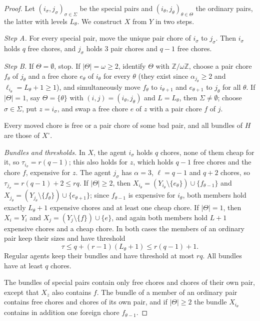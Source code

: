 \documentclass{amsart}
\numberwithin{equation}{section}
\theoremstyle{definition}
\theoremstyle{remark}
\begin{document}
\begin{proof}
Let $(i_\sigma,j_\sigma)_{\sigma\in\Sigma}$ be the special pairs and $(i_\theta,j_\theta)_{\theta\in\Theta}$ the ordinary pairs, the latter with levels $L_\theta$. We construct $X$ from $Y$ in two steps.

\emph{Step A.} For every special pair, move the unique pair chore of $i_\sigma$ to $j_\sigma$. Then $i_\sigma$ holds $q$ free chores, and $j_\sigma$ holds $3$ pair chores and $q-1$ free chores.

\emph{Step B.} If $\Theta=\emptyset$, stop. If $|\Theta|=\omega\ge2$, identify $\Theta$ with $\mathbb Z/\omega\mathbb Z$, choose a pair chore $f_\theta$ of $j_\theta$ and a free chore $e_\theta$ of $i_\theta$ for every $\theta$ (they exist since $\alpha_{j_\theta}\ge2$ and $\ell_{i_\theta}=L_\theta+1\ge1$), and simultaneously move $f_\theta$ to $i_{\theta+1}$ and $e_{\theta+1}$ to $j_\theta$ for all $\theta$. If $|\Theta|=1$, say $\Theta=\{\theta\}$ with $(i,j)=(i_\theta,j_\theta)$ and $L=L_\theta$, then $\Sigma\ne\emptyset$; choose $\sigma\in\Sigma$, put $z=i_\sigma$, and swap a free chore $e$ of $z$ with a pair chore $f$ of $j$.

Every moved chore is free or a pair chore of some bad pair, and all bundles of $H$ are those of $X^\circ$.

\emph{Bundles and thresholds.} In $X$, the agent $i_\sigma$ holds $q$ chores, none of them cheap for it, so $\tau_{i_\sigma}=r(q-1)$; this also holds for $z$, which holds $q-1$ free chores and the chore $f$, expensive for $z$. The agent $j_\sigma$ has $\alpha=3$, $\ell=q-1$ and $q+2$ chores, so $\tau_{j_\sigma}=r(q-1)+2\le rq$. If $|\Theta|\ge2$, then $X_{i_\theta}=(Y_{i_\theta}\setminus\{e_\theta\})\cup\{f_{\theta-1}\}$ and $X_{j_\theta}=(Y_{j_\theta}\setminus\{f_\theta\})\cup\{e_{\theta+1}\}$; since $f_{\theta-1}$ is expensive for $i_\theta$, both members hold exactly $L_\theta+1$ expensive chores and at least one cheap chore. If $|\Theta|=1$, then $X_i=Y_i$ and $X_j=(Y_j\setminus\{f\})\cup\{e\}$, and again both members hold $L+1$ expensive chores and a cheap chore. In both cases the members of an ordinary pair keep their sizes and have threshold
\begin{equation}\label{eq:Tt}
\tau\le q+(r-1)(L_\theta+1)\le r(q-1)+1 .
\end{equation}
Regular agents keep their bundles and have threshold at most $rq$. All bundles have at least $q$ chores.

The bundles of special pairs contain only free chores and chores of their own pair, except that $X_z$ also contains $f$. The bundle of a member of an ordinary pair contains free chores and chores of its own pair, and if $|\Theta|\ge2$ the bundle $X_{i_\theta}$ contains in addition one foreign chore $f_{\theta-1}$.


\end{proof}
\end{document}
